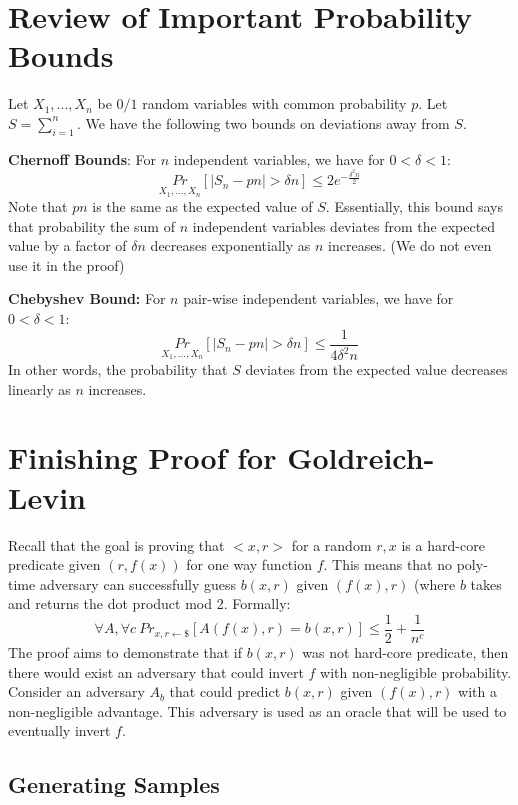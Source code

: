 \documentclass[11pt]{article}
\begin{document}
\section{Review of Important Probability Bounds}
Let $X_1,...,X_n$ be $0/1$ random variables with common probability $p$. Let $S=\sum_{i=1}^{n}$. We have the following two bounds on deviations away from $S$.
\vspace{1em}

\textbf{Chernoff Bounds}: For $n$ independent variables, we have for $0 < \delta < 1$:
$$\underset{X_1,...,X_n}{Pr}[|S_n - pn| > \delta n] \leq 2e^{-\frac{\delta^2n}{2}}$$
Note that $pn$ is the same as the expected value of $S$. Essentially, this bound says that probability the sum of $n$ independent variables deviates from the expected value by a factor of $\delta n$ decreases exponentially as $n$ increases. (We do not even use it in the proof)
\vspace{1em}

\textbf{Chebyshev Bound:} For $n$ pair-wise independent variables, we have for $0 < \delta < 1$:
$$\underset{X_1,...,X_n}{Pr}[|S_n - pn| > \delta n] \leq \frac{1}{4\delta^2n}$$
In other words, the probability that $S$ deviates from the expected value decreases linearly as $n$ increases.
\section{Finishing Proof for Goldreich-Levin}
Recall that the goal is proving that $<x,r>$ for a random $r,x$ is a hard-core predicate given $(r,f(x))$ for one way function $f$. This means that no poly-time adversary can successfully guess $b(x,r)$ given $(f(x),r)$ (where $b$ takes and returns the dot product mod 2. Formally:
$$\forall A, \forall c \ Pr_{x,r \leftarrow \$}[A(f(x),r) = b(x,r)] \leq \frac{1}{2} + \frac{1}{n^c}$$
The proof aims to demonstrate that if $b(x,r)$ was not hard-core predicate, then there would exist an adversary that could invert $f$ with non-negligible probability. Consider an adversary $A_b$ that could predict $b(x,r)$ given $(f(x),r)$ with a non-negligible advantage. This adversary is used as an oracle that will be used to eventually invert $f$.

\subsection{Generating Samples}
\end{document}
